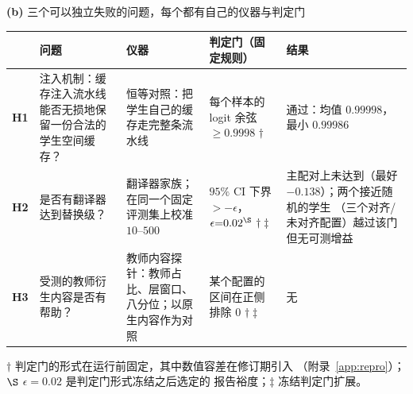 \vspace{1.6mm}
{\footnotesize\textbf{(b)} 三个可以独立失败的问题，每个都有自己的仪器与判定门\par}
\vspace{1.2mm}
{\footnotesize
\setlength{\tabcolsep}{3pt}%
\begin{tabular}{@{}p{0.55cm}p{2.75cm}p{3.35cm}p{3.85cm}p{4.15cm}@{}}
\toprule
 & \textbf{问题} & \textbf{仪器} & \textbf{判定门（固定规则）} & \textbf{结果} \\
\midrule
\textbf{H1} & 注入机制：缓存注入流水线能否无损地保留一份合法的学生空间缓存？
 & 恒等对照：把学生自己的缓存走完整条流水线
 & 每个样本的 logit 余弦 $\ge 0.9998$ $\dagger$
 & 通过：均值 $0.99998$，最小 $0.99986$ \\
\addlinespace[1pt]
\textbf{H2} & 是否有翻译器达到替换级？
 & 翻译器家族；在同一个固定评测集上校准 $10$--$500$
 & $95\%$ CI 下界 $>-\epsilon$，$\epsilon{=}0.02^{\S}$ $\dagger\ddagger$
 & 主配对上未达到（最好 $-0.138$）；两个接近随机的学生
 （三个对齐/未对齐配置）越过该门但无可测增益 \\
\addlinespace[1pt]
\textbf{H3} & 受测的教师衍生内容是否有帮助？
 & 教师内容探针：教师占比、层窗口、八分位；以原生内容作为对照
 & 某个配置的区间在正侧排除 $0$ $\dagger\ddagger$
 & 无 \\
\bottomrule
\end{tabular}}
\par\vspace{1.0mm}
{\tiny $\dagger$ 判定门的形式在运行前固定，其中数值容差在修订期引入
（附录~\ref{app:repro}）；$\S$ $\epsilon{=}0.02$ 是判定门形式冻结之后选定的
报告裕度；$\ddagger$ 冻结判定门扩展。\par}
